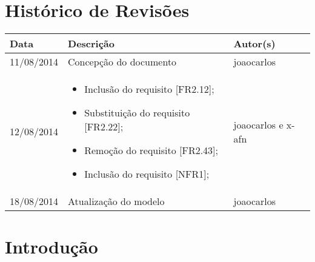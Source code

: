 \documentclass{article}
\begin{document}
\capa

\newpage

\section*{\center Histórico de Revisões}
  \vspace*{1cm}
  \begin{table}[ht]
    \centering
    \begin{tabular}[pos]{|m{2cm} | m{7.2cm} | m{3.8cm}|} 
      \hline
      \cellcolor[gray]{0.9}
      \textbf{Data} & \cellcolor[gray]{0.9}\textbf{Descrição} & \cellcolor[gray]{0.9}\textbf{Autor(s)}\\ \hline
      \hline
      \small 11/08/2014 & \small Concepção do documento & \small joaocarlos \\ \hline      
      \small 12/08/2014 &
      \begin{small}
        \begin{itemize}
          \item Inclusão do requisito [FR2.12];
          \item Substituição do requisito [FR2.22];
          \item Remoção do requisito [FR2.43];
          \item Inclusão do requisito [NFR1];
        \end{itemize}
      \end{small} & \small joaocarlos e x-afn \\ \hline 
      \small 18/08/2014 & \small Atualização do modelo & \small joaocarlos \\ \hline       
    \end{tabular}
  \end{table}

\newpage

\tableofcontents
\newpage

\section{Introdução}
\end{document}

